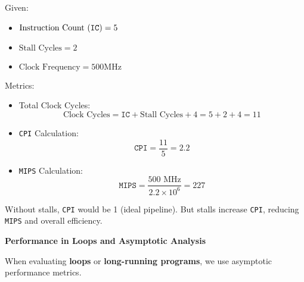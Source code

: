 \begin{examplebox}
   Given:
   \begin{itemize}
      \item $\text{Instruction Count (\texttt{IC})} = 5$
      \item $\text{Stall Cycles} = 2$
      \item $\text{Clock Frequency} = 500 \text{MHz}$
   \end{itemize}
   Metrics:
   \begin{itemize}
      \item Total Clock Cycles:
      \begin{equation*}
         \text{Clock Cycles} = \texttt{IC} + \text{Stall Cycles} + 4 = 5 + 2 + 4 = 11
      \end{equation*}
      \item \texttt{CPI} Calculation:
      \begin{equation*}
         \texttt{CPI} = \dfrac{11}{5} = 2.2
      \end{equation*}
      \item \texttt{MIPS} Calculation:
      \begin{equation*}
         \texttt{MIPS} = \dfrac{500 \text{ MHz}}{2.2 \times 10^{6}} = 227
      \end{equation*}
   \end{itemize}
   Without stalls, \texttt{CPI} would be 1 (ideal pipeline). But stalls increase \texttt{CPI}, reducing \texttt{MIPS} and overall efficiency.
\end{examplebox}

\newpage
\begin{flushleft}
   \textcolor{Green3}{\faIcon{\speedIcon} \textbf{Performance in Loops and Asymptotic Analysis}}
\end{flushleft}
When evaluating \textbf{loops} or \textbf{long-running programs}, we use asymptotic performance metrics.

